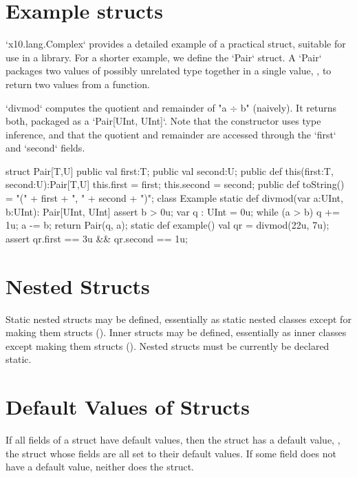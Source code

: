 \section{Example structs}

\xcd`x10.lang.Complex` provides a detailed example of a practical struct,
suitable for use in a library.  For a shorter example, we define the
\xcd`Pair` struct.   A \xcd`Pair` packages
two values of possibly unrelated type together in a single value, \eg, to
return two values from a function.  

\xcd`divmod` computes the quotient and remainder of \xcdmath"a $\div$ b" (naively).
It returns both, packaged as a \xcd`Pair[UInt, UInt]`.  Note that the
constructor uses type inference, and that the quotient and remainder are
accessed through the \xcd`first` and \xcd`second` fields.
\begin{xten}
struct Pair[T,U] {
    public val first:T;
    public val second:U;
    public def this(first:T, second:U):Pair[T,U] {
        this.first = first;
        this.second = second;
    }
    public def toString() 
        = "(" + first + ", " + second + ")";
}
class Example {
  static def divmod(var a:UInt, b:UInt): Pair[UInt, UInt] {
     assert b > 0u;
     var q : UInt = 0u;
     while (a > b) {q += 1u; a -= b;}
     return Pair(q, a); 
  }
  static def example() {
     val qr = divmod(22u, 7u);
     assert qr.first == 3u && qr.second == 1u;
  }
}
\end{xten}

\section{Nested Structs}

Static nested structs may be defined, essentially as static nested classes
except for making them structs
().  Inner structs may be defined, essentially as
inner classes except making them structs ().
\limitationx{} Nested structs must be currently be declared static.

\section{Default Values of Structs}
\label{sect:DefaultValuesOfStructs}


If all fields of a struct have default values, then the struct has a
default value, \viz, the struct whose fields are all set to their
default values.  If some field does not have a default value, neither
does the struct.

